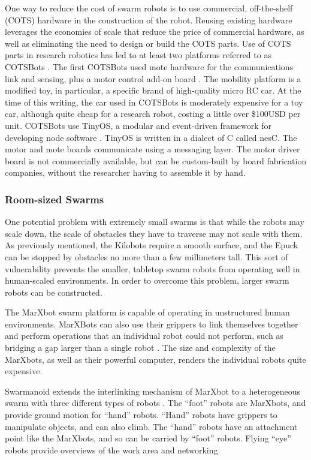 \documentclass[]{article}
\begin{document}
One way to reduce the cost of swarm robots is to use commercial, off-the-shelf (COTS) hardware in the construction of the robot. 
Reusing existing hardware leverages the economies of scale that reduce the price of commercial hardware, as well as eliminating the need to design or build the COTS parts. 
Use of COTS parts in research robotics has led to at least two platforms referred to as COTSBots \cite{bergbreiter2003cotsbots, soule2011cotsbots}.
The first COTSBots used mote hardware for the communications link and sensing, plus a motor control add-on board \cite{bergbreiter2003cotsbots}. 
The mobility platform is a modified toy, in particular, a specific brand of high-quality micro RC car.
At the time of this writing, the car used in COTSBots is moderately expensive for a toy car, although quite cheap for a research robot, costing a little over \$100USD per unit. 
COTSBots use TinyOS, a modular and event-driven framework for developing node software \cite{levis2005tinyos}. 
TinyOS is written in a dialect of C called nesC. The motor and mote boards communicate using a messaging layer. 
The motor driver board is not commercially available, but can be custom-built by board fabrication companies, without the researcher having to assemble it by hand. 

\subsubsection{Room-sized Swarms}

One potential problem with extremely small swarms is that while the robots may scale down, the scale of obstacles they have to traverse may not scale with them. 
As previously mentioned, the Kilobots require a smooth surface, and the Epuck can be stopped by obstacles no more than a few millimeters tall. 
This sort of vulnerability prevents the smaller, tabletop swarm robots from operating well in human-scaled environments. 
In order to overcome this problem, larger swarm robots can be constructed.
 
The MarXbot swarm platform is capable of operating in unstructured human environments. 
MarXBots can also use their grippers to link themselves together and perform operations that an individual robot could not perform, such as bridging a gap larger than a single robot \cite{bonani2010marxbot}. 
The size and complexity of the MarXbots, as well as their powerful computer, renders the individual robots quite expensive. 

Swarmanoid extends the interlinking mechanism of MarXbot to a heterogeneous swarm with three different types of robots \cite{dorigo2013swarmanoid}.
The ``foot'' robots are MarXbots, and provide ground motion for ``hand'' robots. 
``Hand'' robots have grippers to manipulate objects, and can also climb.
The ``hand'' robots have an attachment point like the MarXbots, and so can be carried by ``foot'' robots. 
Flying ``eye'' robots provide overviews of the work area and networking.  
\end{document}
